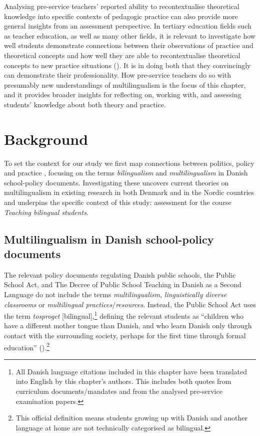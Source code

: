 \documentclass[output=paper]{langscibook}
\begin{document}
Analysing pre-service teachers’ reported ability to recontextualise theoretical knowledge into specific contexts of pedagogic practice can also provide more general insights from an assessment perspective. In tertiary education fields such as teacher education, as well as many other fields, it is relevant to investigate how well students demonstrate connections between their observations of practice and theoretical concepts and how well they are able to recontextualise theoretical concepts to new practice situations (\citealt{Berry2008,RusznyakEtAl2021}). It is in doing both that they convincingly can demonstrate their professionality. How pre-service teachers do so with presumably new understandings of multilingualism is the focus of this chapter, and it provides broader insights for reflecting on, working with, and assessing students’ knowledge about both theory and practice.

\section{Background}

To set the context for our study we first map connections between politics, policy and practice \citep{Biesta2011}, focusing on the terms \textit{bilingualism} and \textit{multilingualism} in Danish school-policy documents. Investigating these uncovers current theories on multilingualism in existing research in both Denmark and in the Nordic countries and underpins the specific context of this study: assessment for the course \textit{Teaching bilingual students}.

\subsection{Multilingualism in Danish school-policy documents}
\begin{sloppypar}
The relevant policy documents regulating Danish public schools, the Public School Act, and The Decree of Public School Teaching in Danish as a Second Language do not include the terms \textit{multilingualism}, \textit{linguistically diverse classrooms} or \textit{multilingual practices}\slash\textit{resources}. Instead, the Public School Act uses the term \textit{tosproget} [bilingual],\footnote{All Danish language citations included in this chapter have been translated into English by this chapter’s authors. This includes both quotes from curriculum documents/mandates and from the analysed pre-service examination papers.} defining the relevant students as “children who have a different mother tongue than Danish, and who learn Danish only through contact with the surrounding society, perhaps for the first time through formal education”  (\citealt{MinistryofChildrenandEducation2022}).\footnote{This official definition means students growing up with Danish and another language at home are not technically categorised as bilingual.}
\end{sloppypar}
\end{document}
